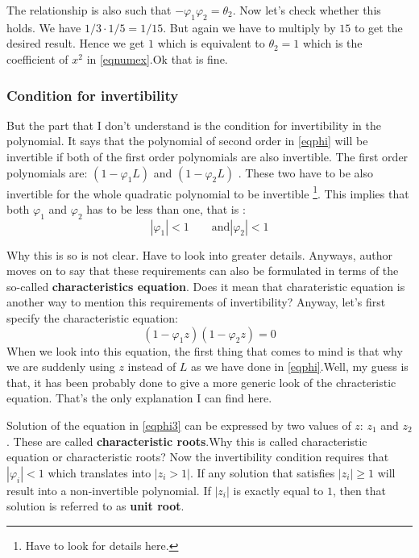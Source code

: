 \documentclass{book}
\begin{document}
   The relationship is also such that $-\varphi_1 \varphi_2= \theta_2$. Now let's check whether this holds. We have $1/3 \cdot 1/5=1/15$. But again we have to multiply by $15$ to get the desired result. Hence we get $1$ which is equivalent to $\theta_2=1$ which is the coefficient of $x^2$ in \eqref{eqnumex}.Ok that is fine. 
  
\subsubsection{Condition for invertibility}
   But the part that I don't understand is the condition for invertibility in the polynomial. It says that the polynomial of second order in \eqref{eqphi} will be invertible if both of the first order polynomials are also invertible. The first order polynomials are: $(1-\varphi_1 L)$ and $(1-\varphi_2 L)$ . These two have to be also invertible for the whole quadratic polynomial to be invertible \footnote{Have to look for details here.}. This implies that both $\varphi_1$ and $\varphi_2$ has to be less than one, that is :
   \begin{equation}
       |\varphi_1| < 1 \qquad \text{and} |\varphi_2| < 1
       \label{eqphi2}
   \end{equation}
  
   Why this is so is not clear. Have to look into greater details. Anyways, author moves on to say that these requirements can also be formulated in terms of the so-called \textbf{characteristics equation}. Does it mean that charateristic equation is another way to mention this requirements of invertibility? Anyway, let's first specify the characteristic equation:
   \begin{equation}
       (1-\varphi_1 z)(1-\varphi_2 z)=0
       \label{eqphi3}
\end{equation}
When we look into this equation, the first thing that comes to mind is that why we are suddenly using $z$ instead of $L$ as we have done in \eqref{eqphi}.Well, my guess is that, it has been probably done to give a more generic look of the chracteristic equation. That's the only explanation I can find here.

Solution of the equation in \eqref{eqphi3} can be expressed by two values of $z$: $z_1$ and $z_2$. These are called \textbf{characteristic roots}.Why this is called characteristic equation or characteristic roots? Now the invertibility condition requires that $|\varphi_i|<1$ which translates into $|z_i>1|$. If any solution that satisfies $|z_i|\ge 1$ will result into a non-invertible polynomial. If $|z_i|$ is exactly equal to $1$, then that solution is referred to as \textbf{unit root}. 
\end{document}
